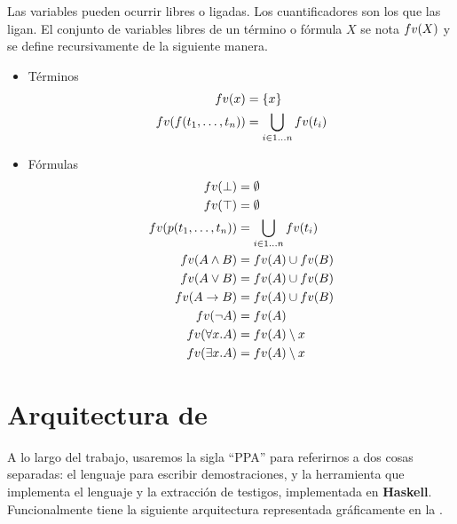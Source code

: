\begin{definition}
    Las variables pueden ocurrir libres o ligadas. Los cuantificadores son los que las ligan. El conjunto de variables libres de un término o fórmula $X$ se nota $fv(X)$ y se define recursivamente de la siguiente manera.

    \begin{itemize}
        \item Términos
        \begin{align*}
            fv(x) &= \{ x \}\\
            fv(f(t_1, \dots, t_n)) &= \bigcup_{i \in 1\dots n} fv(t_i) 
        \end{align*}
    
        \item Fórmulas
        \begin{align*}
            fv(\bot) &=\emptyset\\
            fv(\top) &=\emptyset \\
            fv(p(t_1, \dots, t_n)) &= \bigcup_{i \in 1\dots n} fv(t_i) \\
            fv(A \wedge B) &= fv(A) \cup fv(B)\\
            fv(A \vee B) &=fv(A) \cup fv(B)\\
            fv(A \to B) &=fv(A) \cup fv(B)\\
            fv(\neg A) &=fv(A)\\
            fv(\forall x . A) &= fv(A) \setminus x \\
            fv(\exists x . A) &= fv(A) \setminus x
        \end{align*}
    \end{itemize}
\end{definition}


\section{Arquitectura de \ppaTool{}}

A lo largo del trabajo, usaremos la sigla ``PPA'' para referirnos a dos cosas separadas: \ppaLang{} el lenguaje para escribir demostraciones, y \ppaTool{} la herramienta que implementa el lenguaje y la extracción de testigos,  implementada en \textbf{Haskell}. Funcionalmente tiene la siguiente arquitectura representada gráficamente en la .

